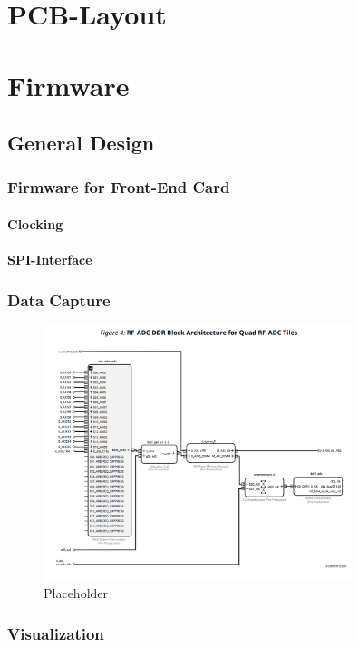 \newpage
\section{PCB-Layout}


  
\newpage
\section{Firmware}
\subsection{General Design}
\subsubsection{Firmware for Front-End Card}
\paragraph{Clocking}
\paragraph{SPI-Interface}
\subsubsection{Data Capture}
\begin{figure}[H]
	\centering
	\includegraphics[width = 0.8\textwidth]{chap/04-work/img/adc_cap}
	\caption{Placeholder}
	\label{fig:adccap}
\end{figure}

\subsubsection{Visualization}





